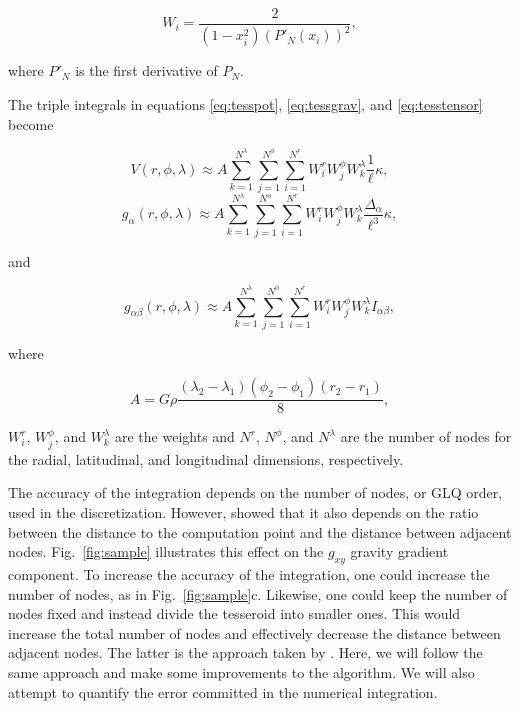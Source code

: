 \begin{equation}
    W_i = \frac{2}{(1 - x_i^2)(P'_N(x_i))^2},
\end{equation}

\noindent
where $P'_N$ is the first derivative of $P_N$.

The triple integrals in equations
\ref{eq:tesspot},
\ref{eq:tessgrav},
and
\ref{eq:tesstensor}
become

\begin{equation}
    V(r,\phi,\lambda) \approx
        A
        \sum\limits_{k=1}^{N^{\lambda}}
        \sum\limits_{j=1}^{N^{\phi}}
        \sum\limits_{i=1}^{N^r}
        W^r_i W^{\phi}_j W^{\lambda}_k
        \frac{1}{\ell} \kappa,
\end{equation}
\begin{equation}
    g_{\alpha}(r,\phi,\lambda) \approx
        A
        \sum\limits_{k=1}^{N^{\lambda}}
        \sum\limits_{j=1}^{N^{\phi}}
        \sum\limits_{i=1}^{N^r}
        W^r_i W^{\phi}_j W^{\lambda}_k
        \frac{\Delta_{\alpha}}{\ell^3} \kappa,
\end{equation}

\noindent
and

\begin{equation}
    g_{\alpha\beta}(r,\phi,\lambda) \approx
        A
        \sum\limits_{k=1}^{N^{\lambda}}
        \sum\limits_{j=1}^{N^{\phi}}
        \sum\limits_{i=1}^{N^r}
        W^r_i W^{\phi}_j W^{\lambda}_k
        I_{\alpha\beta},
\end{equation}

\noindent
where

\begin{equation}
    A = G \rho
    \frac{(\lambda_2 - \lambda_1)(\phi_2 - \phi_1)(r_2 - r_1)}{8},
\end{equation}

\noindent
$W_i^r$, $W_j^{\phi}$, and $W_k^{\lambda}$
are the weights
and $N^r$, $N^{\phi}$, and $N^{\lambda}$
are the number of nodes
for the radial, latitudinal, and longitudinal dimensions, respectively.

The accuracy of the integration
depends on the number of nodes, or GLQ order,
used in the discretization.
However, \citet{Ku1977} showed
that it also depends on the ratio between
the distance to the computation point
and the distance between adjacent nodes.
Fig.~\ref{fig:sample}
illustrates this effect
on the $g_{xy}$ gravity gradient component.
To increase the accuracy of the integration,
one could increase the number of nodes,
as in Fig.~\ref{fig:sample}c.
Likewise,
one could keep the number of nodes fixed
and instead divide the tesseroid into smaller ones.
This would increase the total number of nodes
and effectively decrease
the distance between adjacent nodes.
The latter is the approach
taken by \citet{Li2011}.
Here, we will follow the same approach
and make some improvements to the algorithm.
We will also attempt to quantify
the error committed in the numerical integration.

